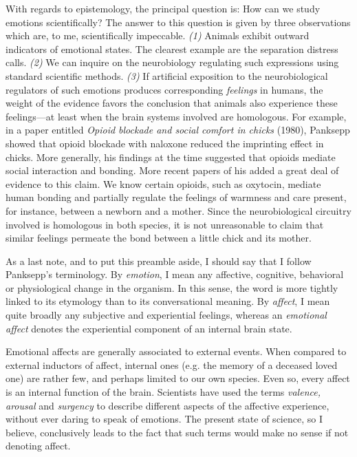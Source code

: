 \documentclass[a4paper]{article}
\begin{document}
With regards to epistemology, the principal question is: How can we study
emotions scientifically? The answer to this question is given by three
observations which are, to me, scientifically impeccable. \textit{(1)} Animals
exhibit outward indicators of emotional states. The clearest example are the
separation distress calls. \textit{(2)} We can inquire on the neurobiology
regulating such expressions using standard scientific methods. \textit{(3)} If
artificial exposition to the neurobiological regulators of such emotions
produces corresponding \textit{feelings} in humans, the weight of the evidence
favors the conclusion that animals also experience these feelings---at least
when the brain systems involved are homologous. For
example, in a paper entitled \textit{Opioid blockade and social comfort in
chicks} (1980), Panksepp showed that opioid blockade with naloxone reduced the
imprinting effect in chicks. More generally, his findings at the time suggested
that opioids mediate social interaction and bonding. More recent papers of his
added a great deal of evidence to this claim. We know certain opioids, such as
oxytocin, mediate human bonding and partially regulate the feelings of warmness
and care present, for instance, between a newborn and a mother. Since the
neurobiological circuitry involved is homologous in both species, it is not
unreasonable to claim that similar feelings permeate the bond between a little
chick and its mother.

As a last note, and to put this preamble aside, I should say that I follow
Panksepp's terminology. By \textit{emotion}, I mean any affective,
cognitive, behavioral or physiological change in the organism. In this sense,
the word is more tightly linked to its etymology than to its conversational
meaning. By \textit{affect}, I mean quite broadly any subjective and
experiential feelings, whereas an \textit{emotional affect} denotes the
experiential component of an internal brain state.

Emotional affects are generally associated to external events. When compared to
external inductors of affect, internal ones (e.g. the memory of a deceased loved
one) are rather few, and perhaps limited to our own species. Even so, every
affect is an internal function of the brain. Scientists have used the terms
\textit{valence, arousal} and \textit{surgency} to describe different aspects of
the affective experience, without ever daring to speak of emotions. The present
state of science, so I believe, conclusively leads to the fact that such terms
would make no sense if not denoting affect.
\end{document}
